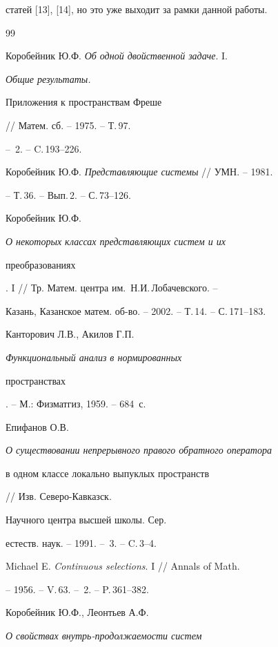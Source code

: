 статей [13], [14], но это уже выходит за рамки данной работы.











\begin{thebibliography}{99}







Коробейник Ю.Ф. {\em Об одной двойственной задаче}. I. {\em Общие результаты.


Приложения к пространствам Фреше} // Матем. сб. -- 1975. -- Т.\,97.


-- \No\,2. -- C.\,193--226.




Коробейник Ю.Ф. {\em Представляющие системы} // УМН. -- 1981.


-- Т.\,36. -- Вып.\,2. -- С.\,73--126.




Коробейник Ю.Ф. {\em О некоторых классах представляющих систем и их


преобразованиях}. I // Тр. Матем. центра им.~Н.И.\,Лобачевского. --


Казань, Казанское матем. об-во. -- 2002. -- Т.\,14. -- С.\,171--183.




Канторович Л.В., Акилов Г.П. {\em Функциональный анализ в нормированных


пространствах}. -- М.: Физматгиз, 1959. -- 684~с.




Епифанов О.В. {\em О существовании непрерывного правого обратного оператора


в одном классе локально выпуклых пространств} // Изв. Северо-Кавказск.


Научного центра высшей школы. Сер.


естеств. наук. -- 1991. -- \No\,3. -- C.\,3--4.




Michael E. {\em Continuous selections}. I // Annals of Math.


-- 1956. -- V.\,63. -- \No\,2. -- P.\,361--382.




Коробейник Ю.Ф., Леонтьев А.Ф. {\em О свойствах внутрь-продолжаемости систем


}
\end{thebibliography}
